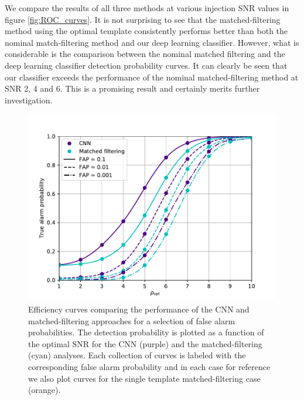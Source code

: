 \documentclass[%
showpacs,
 amsmath,amssymb,
 aps,
 twocolumn,
 prl,
 reprint,
floatfix,
]{revtex4-1}
\newcommand{\optsnr}{\rho_{\mathrm{opt}}}
\newcommand{\chris}[1]{\textbf{\textcolor{green}{CHRIS: #1}}}
\begin{document}
We compare the results of
all three methods at various injection SNR values in figure
\ref{fig:ROC_curves}. It is not surprising to see that the matched-filtering
method using the optimal template consistently performs better than both the
nominal match-filtering method and our deep learning classifier.  However, what
is considerable is the comparison between the nominal matched filtering and the
deep learning classifier detection probability curves. It can clearly be seen
that our classifier exceeds the performance of the nominal matched-filtering
method at SNR 2, 4 and 6. This is a promising result and certainly merits
further investigation.

%
%
\begin{figure}[]
\includegraphics[width=\columnwidth] {figures/efficiency.pdf}
\caption{Efficiency curves comparing the performance of the \ac{CNN} and
matched-filtering approaches for a selection of false alarm probabilities. The
detection probability is plotted as a function of the optimal \ac{SNR} for the 
\ac{CNN} (purple) and the matched-filtering (cyan) analyses. Each collection of
curves is labeled with the corresponding false alarm probability and in each
case for reference we also plot curves for the single template matched-filtering
case (orange).
\label{fig:efficiency_curve}}
\end{figure}
\end{document}
